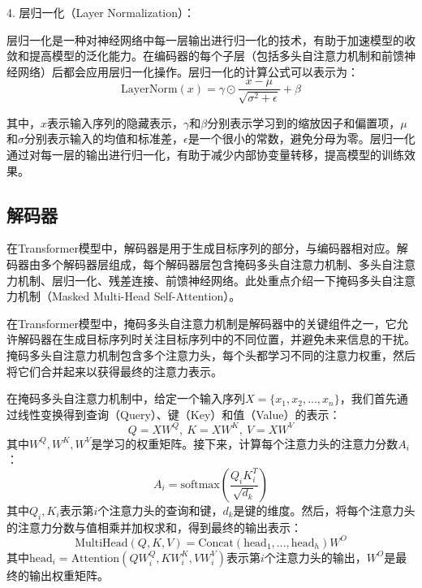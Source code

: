 4. 层归一化（Layer Normalization）：

层归一化是一种对神经网络中每一层输出进行归一化的技术，有助于加速模型的收敛和提高模型的泛化能力。在编码器的每个子层（包括多头自注意力机制和前馈神经网络）后都会应用层归一化操作。层归一化的计算公式可以表示为：
\begin{equation}
	\text{LayerNorm}(x) = \gamma \odot \frac{x - \mu}{\sqrt{\sigma^2 + \epsilon}} + \beta
\end{equation}


其中，$x$表示输入序列的隐藏表示，$\gamma$和$\beta$分别表示学习到的缩放因子和偏置项，$\mu$和$\sigma$分别表示输入的均值和标准差，$\epsilon$是一个很小的常数，避免分母为零。层归一化通过对每一层的输出进行归一化，有助于减少内部协变量转移，提高模型的训练效果。

\subsection{解码器}
在Transformer模型中，解码器是用于生成目标序列的部分，与编码器相对应。解码器由多个解码器层组成，每个解码器层包含掩码多头自注意力机制、多头自注意力机制、层归一化、残差连接、前馈神经网络。此处重点介绍一下掩码多头自注意力机制（Masked Multi-Head Self-Attention）。

在Transformer模型中，掩码多头自注意力机制是解码器中的关键组件之一，它允许解码器在生成目标序列时关注目标序列中的不同位置，并避免未来信息的干扰。掩码多头自注意力机制包含多个注意力头，每个头都学习不同的注意力权重，然后将它们合并起来以获得最终的注意力表示。

在掩码多头自注意力机制中，给定一个输入序列$X = \{x_1, x_2, ..., x_n\}$，我们首先通过线性变换得到查询（Query）、键（Key）和值（Value）的表示：
\begin{equation}
Q = XW^Q, \ K = XW^K, \ V = XW^V
\end{equation}
其中$W^Q, W^K, W^V$是学习的权重矩阵。接下来，计算每个注意力头的注意力分数$A_i$：
\begin{equation}
A_i = \text{softmax}(\frac{Q_iK_i^T}{\sqrt{d_k}})
\end{equation}
其中$Q_i, K_i$表示第$i$个注意力头的查询和键，$d_k$是键的维度。然后，将每个注意力头的注意力分数与值相乘并加权求和，得到最终的输出表示：
\begin{equation}
\text{MultiHead}(Q, K, V) = \text{Concat}(\text{head}_1, ..., \text{head}_h)W^O
\end{equation}
其中$\text{head}_i = \text{Attention}(QW_i^Q, KW_i^K, VW_i^V)$表示第$i$个注意力头的输出，$W^O$是最终的输出权重矩阵。

